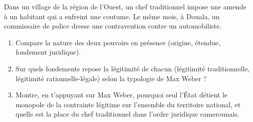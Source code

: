 \documentclass[11pt]{article}
\begin{document}
\begin{exercice}
Dans un village de la région de l'Ouest, un chef traditionnel impose une amende à un habitant qui a enfreint une coutume. Le même mois, à Douala, un commissaire de police dresse une contravention contre un automobiliste.
\begin{enumerate}
\item Compare la nature des deux pouvoirs en présence (origine, étendue, fondement juridique).
\item Sur quels fondements repose la légitimité de chacun (légitimité traditionnelle, légitimité rationnelle-légale) selon la typologie de Max Weber ?
\item Montre, en t'appuyant sur Max Weber, pourquoi seul l'État détient le monopole de la contrainte légitime sur l'ensemble du territoire national, et quelle est la place du chef traditionnel dans l'ordre juridique camerounais.
\end{enumerate}
\end{exercice}
\end{document}
